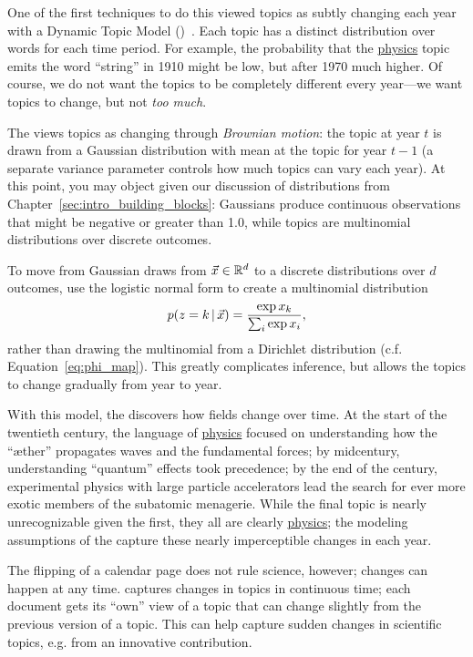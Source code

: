 One of the first techniques to do this viewed topics as subtly
changing each year with a Dynamic Topic
Model ()~\citep{blei-06b}.  Each topic has a distinct
distribution over words for each time period.  For example, the probability that
the \underline{physics} topic emits the word ``string'' in 1910 might be low,
but after 1970 much higher.  Of course, we do not want the topics to be completely
different every year---we want topics to change, but not \emph{too
  much}.

The  views topics as changing through \emph{Brownian
  motion}: the topic at year $t$ is drawn from a Gaussian distribution
with mean at the topic for year $t-1$ (a separate variance parameter
controls how much topics can vary each year).  At this point, you may
object given our discussion of distributions from
Chapter~\ref{sec:intro_building_blocks}: Gaussians produce continuous
observations that might be negative or greater than 1.0, while topics are multinomial distributions over discrete outcomes.

To move from Gaussian draws from $\vec x \in \mathbb{R}^d$ to a discrete distributions
over $d$ outcomes, \citet{blei-06b} use the logistic normal form to
create a multinomial distribution
\begin{equation}
p(z=k \, | \, \vec x)  = \frac{\exp{x_k}}{\sum_i \exp{x_i}},
\end{equation}
rather than drawing the multinomial from a Dirichlet distribution
(c.f. Equation~\ref{eq:phi_map}).
This greatly complicates inference, but allows the topics to change
gradually from year to year.

With this model, the  discovers how fields change over
time.  At the start of the twentieth century, the language of
\underline{physics} focused on understanding how the ``\ae ther''
propagates waves and the fundamental forces; by midcentury,
understanding ``quantum'' effects took precedence; by the end of the
century, experimental physics with large particle accelerators lead
the search for ever more exotic members of the subatomic menagerie.
While the final topic is nearly unrecognizable given the first, they
all are clearly \underline{physics}; the modeling assumptions of the
 capture these nearly imperceptible changes in each year.

The flipping of a calendar page does not rule science, however;
changes can happen at any time.  \citet{wang-08} captures changes in
topics in continuous time; each document gets its ``own'' view of a
topic that can change slightly from the previous version of a topic.
This can help capture sudden changes in scientific topics, e.g. from
an innovative contribution.

